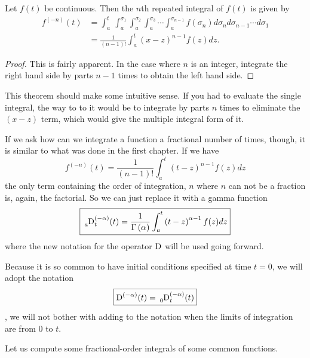 \begin{theorem}
  Let $f(t)$ be continuous. Then the $n$th repeated integral of $f(t)$ is given by
  \begin{align}
   f^{(-n)}(t) &= \int_a^{t}  \ \int_a^{\sigma_1}  \int_a^{\sigma_2}  \int_a^{\sigma_3} \cdots \int_a^{\sigma_{n-1}} f(\sigma_n) d \sigma_n d \sigma_{n-1} \cdots d \sigma_1 \nonumber  \\
   &= \frac{1}{\left( n - 1 \right)!} \int_a^t \left( x - z \right)^{n-1} f(z) dz.
    \label{eq:cauchy}
  \end{align}
 \label{th:cauchy}
\end{theorem}
\begin{proof}
  This is fairly apparent. In the case where $n$ is an integer, integrate the right hand side by parts $n-1$ times to obtain the left hand side. 
\end{proof}

This theorem should make some intuitive sense. If you had to evaluate the single integral, the way to to it would be to integrate by parts $n$ times to eliminate the $(x - z)$ term, which would give the multiple integral form of it.

If we ask how can we integrate a function a fractional number of times, though, it is similar to what was done in the first chapter. If we have
\begin{equation*}
  f^{(-n)}(t) = \frac{1}{\left( n - 1 \right)!} \int_a^t \left( t - z \right)^{n-1} f(z) dz
\end{equation*}
the only term containing the order of integration, $n$ where $n$ can not be a fraction is, again, the factorial. So we can just replace it with a gamma function 
\begin{equation}
  \boxed{ \tensor*[_a]{\D}{^{(-\alpha)}_t}(t) = \frac{1}{\Gamma \left( \alpha \right)} \int_a^t \left( t - z \right)^{\alpha-1} f(z) dz }
  \label{eq:fracint}
\end{equation}
where the new notation for the operator $\operatorname{D}$ will be used going forward.

Because it is so common to have initial conditions specified at time $t=0$, we will adopt the notation 
\begin{equation*}
 \boxed{
 \tensor*[]{\D}{^{(-\alpha)}}(t) =   \tensor*[_0]{\D}{^{(-\alpha)}_t}(t) 
} 
\end{equation*}
\ie, we will not bother with adding to the notation when the limits of integration are from $0$ to $t$. 

Let us compute some fractional-order integrals of some common functions.

